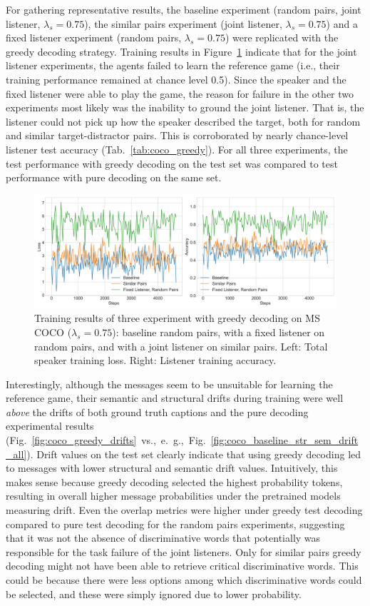 For gathering representative results, the baseline experiment (random pairs, joint listener, $\lambda_s=0.75$), the similar pairs experiment (joint listener, $\lambda_s=0.75$) and a fixed listener experiment (random pairs, $\lambda_s=0.75$) were replicated with the greedy decoding strategy. Training results in Figure~\ref{fig:coco_greedy_baseline} indicate that for the joint listener experiments, the agents failed to learn the reference game (i.e., their training performance remained at chance level 0.5). Since the speaker and the fixed listener were able to play the game, the reason for failure in the other two experiments most likely was the inability to ground the joint listener. That is, the listener could not pick up how the speaker described the target, both for random and similar target-distractor pairs. This is corroborated by nearly chance-level listener test accuracy (Tab.~\ref{tab:coco_greedy}). For all three experiments, the test performance with greedy decoding on the test set was compared to test performance with pure decoding on the same set. 
\begin{figure}[h]
	\centering
	\includegraphics[width=\linewidth]{images/coco_greedy_all_075_losses.png}
	\caption{Training results of three experiment with greedy decoding on MS COCO ($\lambda_s = 0.75$): baseline random pairs, with a fixed listener on random pairs, and with a joint listener on similar pairs. Left: Total speaker training loss. Right: Listener training accuracy.}
	\label{fig:coco_greedy_baseline}
\end{figure} 
Interestingly, although the messages seem to be unsuitable for learning the reference game, their semantic and structural drifts during training were well \emph{above} the drifts of both ground truth captions and the pure decoding experimental results (Fig.~\ref{fig:coco_greedy_drifts}~vs.,~e.~g.,~Fig.~\ref{fig:coco_baseline_str_sem_drift_all}). Drift values on the test set clearly indicate that using greedy decoding led to messages with lower structural and semantic drift values. Intuitively, this makes sense because greedy decoding selected the highest probability tokens, resulting in overall higher message probabilities under the pretrained models measuring drift. Even the overlap metrics were higher under greedy test decoding compared to pure test decoding for the random pairs experiments, suggesting that it was not the absence of discriminative words that potentially was responsible for the task failure of the joint listeners. Only for similar pairs greedy decoding might not have been able to retrieve critical discriminative words. This could be because there were less options among which discriminative words could be selected, and these were simply ignored due to lower probability.

